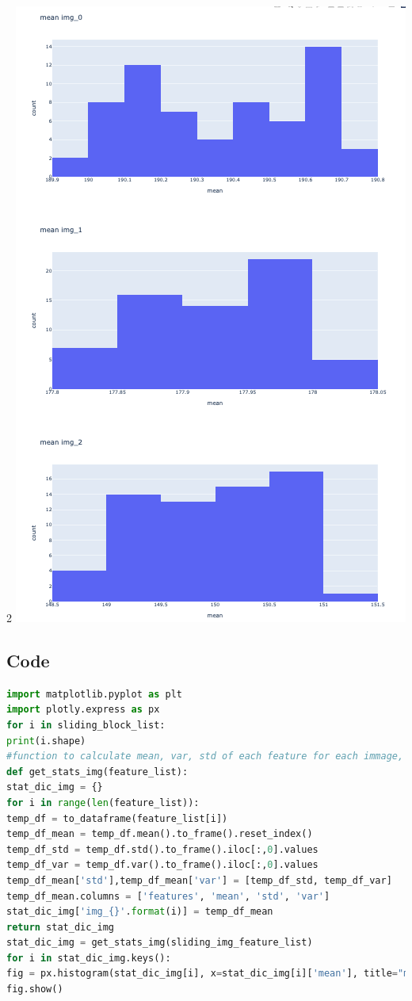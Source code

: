 \documentclass{article}
\begin{document}
\begin{multicols}{2}
	\centering
	\includegraphics[scale=0.3]{../screenshots/histogram.png}
\end{multicols}

\subsection{Code}
\begin{lstlisting}[language=Python]
import matplotlib.pyplot as plt
import plotly.express as px
for i in sliding_block_list:
print(i.shape)
#function to calculate mean, var, std of each feature for each immage, convert it to df for each image respectively and put them in dictionary
def get_stats_img(feature_list):    
stat_dic_img = {}
for i in range(len(feature_list)):
temp_df = to_dataframe(feature_list[i])
temp_df_mean = temp_df.mean().to_frame().reset_index()
temp_df_std = temp_df.std().to_frame().iloc[:,0].values
temp_df_var = temp_df.var().to_frame().iloc[:,0].values
temp_df_mean['std'],temp_df_mean['var'] = [temp_df_std, temp_df_var]
temp_df_mean.columns = ['features', 'mean', 'std', 'var']
stat_dic_img['img_{}'.format(i)] = temp_df_mean
return stat_dic_img
stat_dic_img = get_stats_img(sliding_img_feature_list)
for i in stat_dic_img.keys():
fig = px.histogram(stat_dic_img[i], x=stat_dic_img[i]['mean'], title="mean {}".format(str(i)))
fig.show()
\end{lstlisting}
\end{document}
